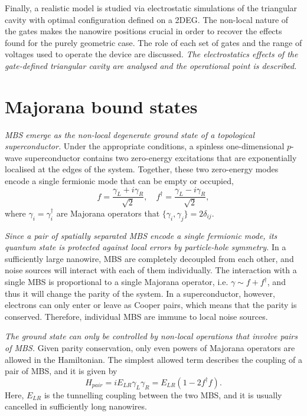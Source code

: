 Finally, a realistic model is studied via electrostatic simulations of the triangular cavity with optimal configuration defined on a 2DEG.
The non-local nature of the gates makes the nanowire positions crucial in order to recover the effects found for the purely geometric case.
The role of each set of gates and the range of voltages used to operate the device are discussed.
\textit{The electrostatics effects of the gate-defined triangular cavity are analysed and the operational point is described.}


\section{Majorana bound states}

\textit{MBS emerge as the non-local degenerate ground state of a topological superconductor.}
Under the appropriate conditions, a spinless one-dimensional $p$-wave superconductor contains two zero-energy excitations that are exponentially localised at the edges of the system. 
Together, these two zero-energy modes encode a single fermionic mode that can be empty or occupied, 
\begin{equation}
f = \frac{\gamma_{L} + i\gamma_{R}}{\sqrt{2}}, \quad f^{\dagger} = \frac{\gamma_{L} - i \gamma_{R}}{\sqrt{2}},
\end{equation}
where $\gamma_{i} = \gamma_{i}^{\dagger}$ are Majorana operators that $\{ \gamma_{i}, \gamma_{j} \} = 2\delta_{ij}$.

\textit{Since a pair of spatially separated MBS encode a single fermionic mode, its quantum state is protected against local errors by particle-hole symmetry.}
In a sufficiently large nanowire, MBS are completely decoupled from each other, and noise sources will interact with each of them individually.
The interaction with a single MBS is proportional to a single Majorana operator, i.e. $\gamma \sim f + f^{\dagger}$, and thus it will change the parity of the system.
In a superconductor, however, electrons can only enter or leave as Cooper pairs, which means that the parity is conserved. 
Therefore, individual MBS are immune to local noise sources.

\textit{The ground state can only be controlled by non-local operations that involve pairs of MBS.}
Given parity conservation, only even powers of Majorana operators are allowed in the Hamiltonian.
The simplest allowed term describes the coupling of a pair of MBS, and it is given by
\begin{equation}
H_{pair} = i E_{LR} \gamma_{L} \gamma_{R} = E_{LR} (1 - 2 f^{\dagger} f).
\end{equation}
Here, $E_{LR}$ is the tunnelling coupling between the two MBS, and it is usually cancelled in sufficiently long nanowires.

